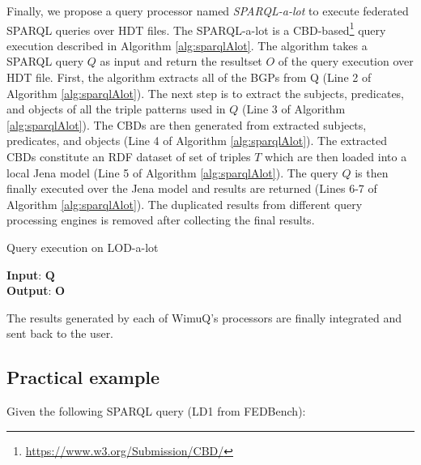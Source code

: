 Finally, we propose a query processor named \emph{SPARQL-a-lot} to execute federated SPARQL queries over HDT files. The SPARQL-a-lot is a CBD-based\footnote{\label{cbd}\url{https://www.w3.org/Submission/CBD/}} query execution described in Algorithm \ref{alg:sparqlAlot}. The algorithm takes a SPARQL query $Q$ as input and return the resultset $O$ of the query execution over HDT file. First, the algorithm extracts all of the BGPs from Q (Line 2 of Algorithm \ref{alg:sparqlAlot}). The next step is to extract the subjects, predicates, and objects of all the triple patterns used in $Q$ (Line 3 of Algorithm \ref{alg:sparqlAlot}). The CBDs are then generated from extracted subjects, predicates, and objects (Line 4 of Algorithm \ref{alg:sparqlAlot}). The extracted CBDs constitute an RDF dataset of set of triples $T$ which are then loaded into a local Jena model (Line 5 of Algorithm \ref{alg:sparqlAlot}). The query $Q$ is then finally executed over the Jena model and results are returned (Lines 6-7 of Algorithm \ref{alg:sparqlAlot}). The duplicated results from different query processing engines is removed after collecting the final results. 

\begin{algorithm} [H] 
	\caption{Query execution on LOD-a-lot}
	\label{alg:sparqlAlot}
    	\textbf{Input}: $\mathbf{Q}$  \\
    	\textbf{Output}: $\mathbf{O}$ 
    	\begin{algorithmic}[1]    		
        		  
        		 
    		\EndProcedure
    	\end{algorithmic}
\end{algorithm}

The results generated by each of WimuQ's processors are finally integrated and sent back to the user. 

\subsection{Practical example}
Given the following SPARQL query (LD1 from FEDBench\cite{fedbench2011}):

